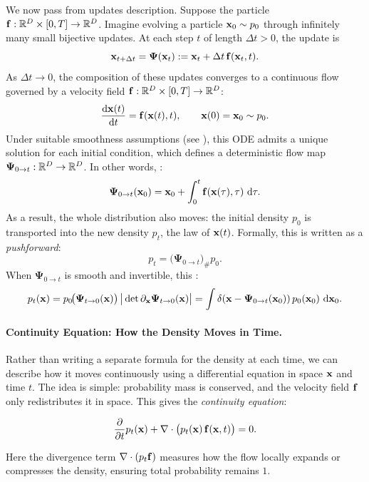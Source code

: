 We now pass from  updates  description.  
Suppose the particle  
${\mathbf{f}}:\mathbb{R}^D \times [0,T]\to \mathbb{R}^D$.  
Imagine evolving a particle ${\mathbf{x}}_0 \sim p_0$ through infinitely many small bijective updates.  
At each step $t$ of length $\Delta t>0$, the update is
\[
{\mathbf{x}}_{t+\Delta t} = \bm{\Psi}({\mathbf{x}}_t) 
:= {\mathbf{x}}_t + \Delta t\, {\mathbf{f}}({\mathbf{x}}_t, t).
\]
As $\Delta t \to 0$, the composition of these updates converges to a continuous flow governed by a velocity field ${\mathbf{f}}:\mathbb{R}^D \times [0,T]\to \mathbb{R}^D$:
\begin{align}\label{eq:ode-f-continuity}
    \frac{\mathop{}\!\mathrm{d} {\mathbf{x}}(t)}{\mathop{}\!\mathrm{d} t} = {\mathbf{f}}({\mathbf{x}}(t), t),
    \qquad {\mathbf{x}}(0) = {\mathbf{x}}_0 \sim p_0.
\end{align}
Under suitable smoothness assumptions (see ), this ODE admits a unique solution for each initial condition, which defines a deterministic flow map 
$\bm{\Psi}_{0\to t}:\mathbb{R}^D \to \mathbb{R}^D$.  
In other words,   :
\[
\bm{\Psi}_{0\to t}({\mathbf{x}}_0) 
= {\mathbf{x}}_0 + \int_{0}^{t} {\mathbf{f}}({\mathbf{x}}(\tau), \tau)\,\mathop{}\!\mathrm{d}\tau.
\]
As a result, the whole distribution also moves: the initial density $p_0$ is transported into the new density $p_t$, the law of ${\mathbf{x}}(t)$.  
Formally, this is written as a \emph{pushforward}:
\[
p_t = \big(\bm{\Psi}_{0\to t}\big)_{\#} p_0.
\]
When $\bm{\Psi}_{0\to t}$ is smooth and invertible, this :
\[
p_t({\mathbf{x}}) 
= p_0\!\big(\bm{\Psi}_{t\to 0}({\mathbf{x}})\big)\,
   \big|\det \partial_{\mathbf{x}}\bm{\Psi}_{t\to 0}({\mathbf{x}})\big|
= \int \delta\!\left({\mathbf{x}} - \bm{\Psi}_{0\to t}({\mathbf{x}}_0)\right) 
   p_0({\mathbf{x}}_0)\,\mathop{}\!\mathrm{d}{\mathbf{x}}_0. 
\]

\paragraph{Continuity Equation: How the Density Moves in Time.}
Rather than writing a separate formula for the density at each time, we can describe how it moves continuously using a differential equation in space ${\mathbf{x}}$ and time $t$.
The idea is simple: probability mass is conserved, and the velocity field ${\mathbf{f}}$ only redistributes it in space.  
This gives the \emph{continuity equation}:
\begin{mdframed}
\begin{align}\label{eq:continuity-cov}
    \frac{\partial}{\partial t} p_t({\mathbf{x}}) 
    + \nabla \cdot \big( p_t({\mathbf{x}})\,{\mathbf{f}}({\mathbf{x}}, t) \big) = 0.
\end{align}
\end{mdframed}
Here the divergence term $\nabla \cdot (p_t {\mathbf{f}})$ measures how the flow locally expands or compresses the density, ensuring total probability remains $1$.

